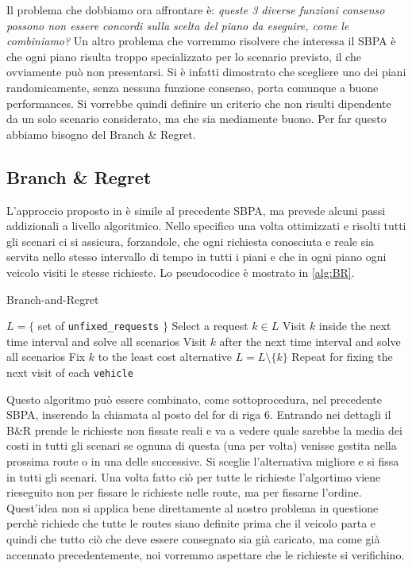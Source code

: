 \documentclass[
    article,            %
    12pt,                %
    oneside,            %
    a4paper,            %
    english,            %
    italian,                %
    sumario=tradicional,
]{abntex2}
\begin{document}
Il problema che dobbiamo ora affrontare è: \textit{queste 3 diverse funzioni consenso possono non essere concordi sulla scelta del piano da eseguire, come le combiniamo?}\newline
Un altro problema che vorremmo risolvere che interessa il SBPA è che ogni piano risulta troppo specializzato per lo scenario previsto, il che ovviamente può non presentarsi. Si è infatti dimostrato che scegliere uno dei piani randomicamente, senza nessuna funzione consenso, porta comunque a buone performances. Si vorrebbe quindi definire un criterio che non risulti dipendente da un solo scenario considerato, ma che sia mediamente buono. Per far questo abbiamo bisogno del Branch \& Regret.

\hypertarget{branch-and-regret}{%
\subsection{Branch \& Regret}\label{branch-and-regret}}
L'approccio proposto in \textcite{BRH} è simile al precedente SBPA, ma prevede alcuni passi addizionali a livello algoritmico. Nello specifico una volta ottimizzati e risolti tutti gli scenari ci si assicura, forzandole, che ogni richiesta conosciuta e reale sia servita nello stesso intervallo di tempo in tutti i piani e che in ogni piano ogni veicolo visiti le stesse richieste. Lo pseudocodice è mostrato in \ref{alg:BR}.

\begin{algorithm}
    \caption{Branch-and-Regret}
    \begin{algorithmic}
    \label{alg:BR}
        \State $L = \{$ set of \texttt{unfixed\_requests} $\}$
            \State Select a request $k\in L$
            \State Visit $k$ inside the next time interval and solve all scenarios
            \State Visit $k$ after the next time interval and solve all scenarios
            \State Fix $k$ to the least cost alternative
            \State $L = L \setminus \{k\}$
        \EndWhile
        \State Repeat for fixing the next visit of each \texttt{vehicle}
    \end{algorithmic}
\end{algorithm}

Questo algoritmo può essere combinato, come sottoprocedura, nel precedente SBPA, inserendo la chiamata al posto del for di riga 6. Entrando nei dettagli il B\&R prende le richieste non fissate reali e va a vedere quale sarebbe la media dei costi in tutti gli scenari se ognuna di questa (una per volta) venisse gestita nella prossima route o in una delle successive. Si sceglie l'alternativa migliore e si fissa in tutti gli scenari. Una volta fatto ciò per tutte le richieste l'algortimo viene rieseguito non per fissare le richieste nelle route, ma per fissarne l'ordine. Quest'idea non si applica bene direttamente al nostro problema in questione perchè richiede che tutte le routes siano definite prima che il veicolo parta e quindi che tutto ciò che deve essere consegnato sia già caricato, ma come già accennato precedentemente, noi vorremmo aspettare che le richieste si verifichino.
\end{document}
